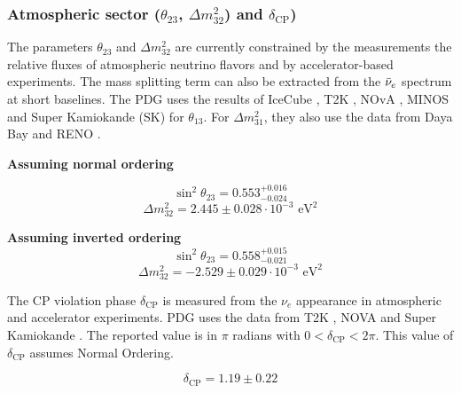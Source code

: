 \subsubsection{Atmospheric sector ($\theta_{23}$, $\Delta m^2_{32}$) and $\delta_{\text{CP}}$)}

The parameters $\theta_{23}$ and $\Delta m^2_{32}$ are currently constrained by the measurements the relative fluxes of atmospheric neutrino flavors and by accelerator-based experiments. The mass splitting term can also be extracted from the $\bar{\nu}_{e}$ spectrum at short baselines. The PDG uses the results of IceCube \cite{icecube_collaboration_measurement_2023}, T2K \cite{abe_measurements_2023}, NOvA \cite{the_nova_collaboration_improved_2022}, MINOS \cite{minos_collaboration_precision_2020} and Super Kamiokande (SK) \cite{super-kamiokande_collaboration_atmospheric_2018} for $\theta_{13}$. For $\Delta m^2_{31}$, they also use the data from Daya Bay \cite{daya_bay_collaboration_precision_2023} and RENO \cite{reno_collaboration_measurement_2018}.

\textbf{Assuming normal ordering}

\begin{equation*}
  \sin^2\theta_{23} = 0.553^{+0.016}_{-0.024}
\end{equation*}
\begin{equation*}
  \Delta m^2_{32} = 2.445 \pm 0.028 \cdot 10^{-3} \text{ eV}^2
\end{equation*}

\textbf{Assuming inverted ordering}
\begin{equation*}
  \sin^2\theta_{23} = 0.558^{+0.015}_{-0.021}
\end{equation*}
\begin{equation*}
  \Delta m^2_{32} = -2.529 \pm 0.029 \cdot 10^{-3} \text{ eV}^2
\end{equation*}

The CP violation phase $\delta_{\text{CP}}$ is measured from the $\nu_e$ appearance in atmospheric and accelerator experiments. PDG uses the data from T2K \cite{abe_measurements_2023}, NOVA \cite{the_nova_collaboration_improved_2022} and Super Kamiokande \cite{super-kamiokande_collaboration_atmospheric_2018}. The reported value is in $\pi$ radians with $0 < \delta_{\text{CP}} < 2 \pi$. This value of $\delta_{\text{CP}}$ assumes Normal Ordering.

\begin{equation*}
  \delta_{\text{CP}} = 1.19 \pm 0.22
\end{equation*}

